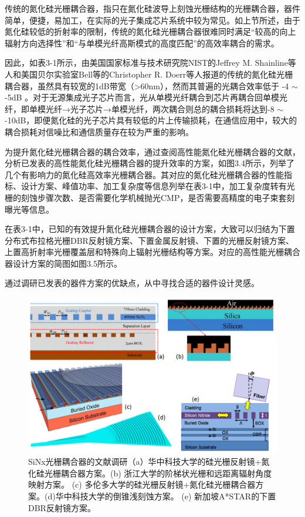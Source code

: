 传统的氮化硅光栅耦合器，指只在氮化硅波导上刻蚀光栅结构的光栅耦合器，器件简单，便捷，易加工，在实际的光子集成芯片系统中较为常见。如上节所述，由于氮化硅较低的折射率的限制，传统的氮化硅光栅耦合器很难同时满足“较高的向上辐射方向选择性”和“与单模光纤高斯模式的高度匹配”的高效率耦合的需求。

因此，如表3-1所示，由美国国家标准与技术研究院NIST的Jeffrey M. Shainline等人和美国贝尔实验室Bell等的Christopher R. Doerr等人报道的传统的氮化硅光栅耦合器，虽然具有较宽的1dB带宽（>60nm），然而其普遍的光耦合效率低于 -4 $\sim$ -5dB \cite{Shainline2017Room,Zhang2014High,Doerr2010Wide}。对于无源集成光子芯片而言，光从单模光纤耦合到芯片再耦合回单模光纤，即单模光纤→光子芯片→单模光纤，两次耦合则总的耦合损耗将达到-8 $\sim$ -10dB，即便氮化硅的光子芯片具有较低的片上传输损耗，在通信应用中，较大的耦合损耗对信噪比和通信质量存在较为严重的影响。

为提升氮化硅光栅耦合器的耦合效率，通过查阅高性能氮化硅光栅耦合器的文献，分析已发表的高性能氮化硅光栅耦合器的提升效率的方案，如图3.4所示，列举了几个有影响力的氮化硅高效率光栅耦合器。其对应的氮化硅光栅耦合器的性能指标、设计方案、峰值功率、加工复杂度等信息列举在表3-1中，加工复杂度转有光栅的刻蚀步骤次数、是否需要化学机械抛光CMP，是否需要高精度的电子束套刻曝光等信息。

在表3-1中，已知的有效提升氮化硅光栅耦合器的设计方案，大致可以归结为下置分布式布拉格光栅DBR反射镜方案、下置金属反射镜、下置的光栅反射镜方案、上置高折射率光栅覆盖层和特殊向上辐射光栅结构等方案。对应的高性能光栅耦合器设计方案的简图如图3.5所示。

通过调研已发表的器件方案的优缺点，从中寻找合适的器件设计灵感。

\begin{figure}[!htbp]
    \centering
    \includegraphics[width=1\textwidth]{Img/3-4.png}
    \caption{ SiNx光栅耦合器的文献调研（a）华中科技大学的硅光栅反射镜+氮化硅光栅耦合器方案。(b) 浙江大学的阶梯状光栅和远距离辐射角度映射方案。 (c) 多伦多大学的硅光栅反射镜+氮化硅光栅耦合器方案。(d)华中科技大学的倒锥浅刻蚀方案。 (e) 新加坡A*STAR的下置DBR反射镜方案。\cite{Cheng2016Compact,Huijuan2014Efficient,Sacher2014Wide,Jinghui2015Ultra,Chen2016High}}
    \label{fig:3-4}
\end{figure}

